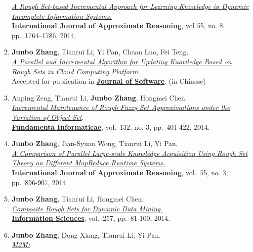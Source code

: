\documentclass[]{article}
\begin{document}
\begin{enumerate}
  \href{http://dx.doi.org/10.1016/j.ijar.2014.05.009}{\emph{A Rough
  Set-based Incremental Approach for Learning Knowledge in Dynamic
  Incomplete Information Systems.}}\\
  \href{http://www.journals.elsevier.com/international-journal-of-approximate-reasoning}{\textbf{International
  Journal of Approximate Reasoning}}, vol 55, no. 8, pp.~1764--1786,
  2014.
\item
  \textbf{Junbo Zhang}, Tianrui Li, Yi Pan, Chuan Luo, Fei Teng.\\
  \href{http://dx.doi.org/10.13328/j.cnki.jos.004590}{\emph{A Parallel
  and Incremental Algorithm for Updating Knowledge Based on Rough Sets
  in Cloud Computing Platform.}}\\ Accepted for publication in
  \href{http://www.jos.org.cn/ch/index.aspx}{\textbf{Journal of
  Software}}. (in Chinese)
\item
  Anping Zeng, Tianrui Li, \textbf{Junbo Zhang}, Hongmei Chen.\\
  \href{http://dx.doi.org/10.3233/FI-2014-1051}{\emph{Incremental
  Maintenance of Rough Fuzzy Set Approximations under the Variation of
  Object Set}}.\\
  \href{http://www.iospress.nl/journal/fundamenta-informaticae}{\textbf{Fundamenta
  Informaticae}}, vol.~132, no. 3, pp.~401-422, 2014.
\item
  \textbf{Junbo Zhang}, Jian-Syuan Wong, Tianrui Li, Yi Pan.\\
  \href{http://dx.doi.org/10.1016/j.ijar.2013.08.003}{\emph{A Comparison
  of Parallel Large-scale Knowledge Acquisition Using Rough Set Theory
  on Different MapReduce Runtime Systems.}}\\
  \href{http://www.journals.elsevier.com/international-journal-of-approximate-reasoning}{\textbf{International
  Journal of Approximate Reasoning}}, vol.~55, no. 3, pp.~896-907, 2014.
\item
  \textbf{Junbo Zhang}, Tianrui Li, Hongmei Chen.\\
  \href{http://dx.doi.org/10.1016/j.ins.2013.08.016}{\emph{Composite
  Rough Sets for Dynamic Data Mining.}}\\
  \href{http://www.journals.elsevier.com/information-sciences}{\textbf{Information
  Sciences}}, vol.~257, pp.~81-100, 2014.
\item
  \textbf{Junbo Zhang}, Dong Xiang, Tianrui Li, Yi Pan.\\
  \href{http://ieeexplore.ieee.org/xpl/articleDetails.jsp?tp=\&arnumber=6449402\&contentType=Journals+\%26+Magazines\&queryText\%3DM2M\%3A+A+simple+Matlab-to-MapReduce+translator+for+Cloud+Computing}{\emph{M2M:
}}
\end{enumerate}
\end{document}
